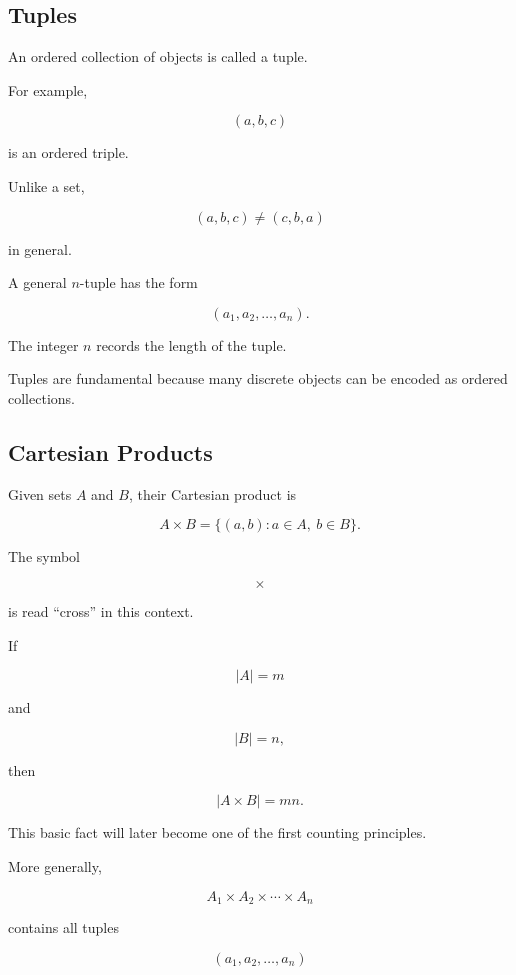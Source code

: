 \subsection{Tuples}
\label{subsec:discrete-tuples}

An ordered collection of objects is called a tuple.

For example,

\[
(a,b,c)
\]

is an ordered triple.

Unlike a set,

\[
(a,b,c)
\neq
(c,b,a)
\]

in general.

A general \(n\)-tuple has the form

\[
\boxed{
(a_1,a_2,\ldots,a_n).
}
\]

The integer \(n\) records the length of the tuple.

Tuples are fundamental because many discrete objects can be encoded as
ordered collections.

\subsection{Cartesian Products}
\label{subsec:discrete-cartesian-products}

Given sets \(A\) and \(B\), their Cartesian product is

\[
\boxed{
A\times B
=
\{(a,b):a\in A,\ b\in B\}.
}
\]

The symbol

\[
\times
\]

is read ``cross'' in this context.

If

\[
|A|=m
\]

and

\[
|B|=n,
\]

then

\[
\boxed{
|A\times B|=mn.
}
\]

This basic fact will later become one of the first counting principles.

More generally,

\[
A_1\times A_2\times\cdots\times A_n
\]

contains all tuples

\[
(a_1,a_2,\ldots,a_n)
\]

